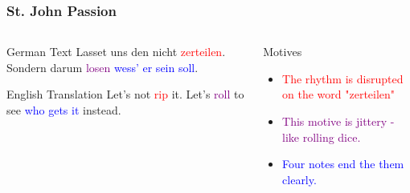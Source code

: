 	\begin{frame}
		\frametitle{St. John Passion}
		\begin{columns}[t]
		
		\begin{column}{0.5\textwidth}
		\begin{block}{German Text}
		Lasset uns den nicht \textcolor{red}{zerteilen}. Sondern darum \textcolor{purple}{losen} \textcolor{blue}{wess' er sein soll}.
		\end{block}
	
		\begin{block}{English Translation}
			Let's not \textcolor{red}{rip} it. Let's \textcolor{purple}{roll} to see \textcolor{blue}{who gets it} instead.
		\end{block}
		\end{column}
	
	
	\begin{column}{0.5\textwidth}
		\begin{block}{Motives}
			\begin{itemize}
				\item \textcolor{red}{The rhythm is disrupted on the word "zerteilen" }
				\item \textcolor{purple}{This motive is jittery - like rolling dice.}
				\item \textcolor{blue}{Four notes end the them clearly.}
			\end{itemize}
		\end{block}
	\end{column}
	
	\end{columns}
		
	\end{frame}